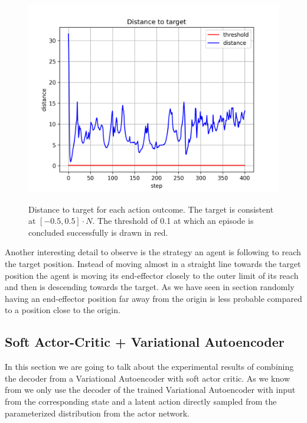 \begin{figure}
\begin{center}
{        \includegraphics[width=0.31 \linewidth]{figures/experiments/Distance_to_target_baseline_20_1691619159_5000.png}
            \label{fig:SAC_baseline_inference/distance_20}
            }
    \end{center}
    \caption[SAC baseline inference]{Distance to target for each action outcome. The target is consistent at $[-0.5, 0.5] \cdot N$. The threshold of 0.1 at which an episode is concluded successfully is drawn in red.} 
    \label{fig:SAC_baseline_inference_distance}
\end{figure}
Another interesting detail to observe is the strategy an agent is following to reach the target position. Instead of moving almost in a straight line towards the target position the agent is moving its end-effector closely to the outer limit of its reach and then is descending towards the target. As we have seen in section  randomly having an end-effector position far away from the origin is less probable compared to a position close to the origin. 

\subsection{Soft Actor-Critic + Variational Autoencoder}

In this section we are going to talk about the experimental results of combining the decoder from a Variational Autoencoder with soft actor critic. As we know from  we only use the decoder of the trained Variational Autoencoder with input from the corresponding state and a latent action directly sampled from the parameterized distribution from the actor network.

